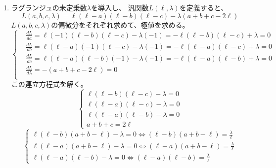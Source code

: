 \begin{enumerate}
  \item ラグランジュの未定乗数\(\lambda\)を導入し、
  汎関数\(L\left(\ell, \lambda\right)\)を定義すると、
  \begin{equation}\label{equation:1_2_a_1}
    L\left(a, b, c, \lambda\right) =
    \ell \left(\ell - a\right) \left(\ell - b\right) \left(\ell - c\right)
    - \lambda \left(a + b + c - 2 \ell\right)
  \end{equation}
  \(L\left(a, b, c, \lambda\right)\)の偏微分をそれぞれ求めて、極値を求める。
  \begin{equation}\label{equation:1_2_a_2}
    \left\{
    \begin{split}
      &\frac{dL}{da} = \ell (-1)    (\ell - b) (\ell - c) - \lambda (-1) = -\ell (\ell - b) (\ell - c) + \lambda = 0\\
      &\frac{dL}{db} = \ell (\ell - a) (-1)    (\ell - c) - \lambda (-1) = -\ell (\ell - a) (\ell - c) + \lambda = 0\\
      &\frac{dL}{dc} = \ell (\ell - a) (\ell - b) (-1)    - \lambda (-1) = -\ell (\ell - a) (\ell - b) + \lambda = 0\\
      &\frac{dL}{d\lambda} = - \left(a + b + c - 2 \ell\right) = 0\\
    \end{split}
    \right.
  \end{equation}
  この連立方程式を解く。
  \begin{equation}\label{equation:1_2_a_3}
    \left\{
    \begin{split}
      \ell (\ell - b) (\ell - c) - \lambda = 0\\
      \ell (\ell - a) (\ell - c) - \lambda = 0\\
      \ell (\ell - a) (\ell - b) - \lambda = 0\\
      a + b + c = 2 \ell
    \end{split}
    \right.
  \end{equation}
  \begin{equation}\label{equation:1_2_a_4}
    \left\{
    \begin{split}
      \ell (\ell - b) (a + b - \ell) - \lambda = 0 \Leftrightarrow (\ell - b) (a + b - \ell) = \frac{\lambda}{\ell} \\
      \ell (\ell - a) (a + b - \ell) - \lambda = 0 \Leftrightarrow (\ell - a) (a + b - \ell) = \frac{\lambda}{\ell} \\
      \ell (\ell - a) (\ell - b) - \lambda = 0 \Leftrightarrow (\ell - a) (\ell - b) = \frac{\lambda}{\ell}
    \end{split}

\end{equation}
\end{enumerate}
